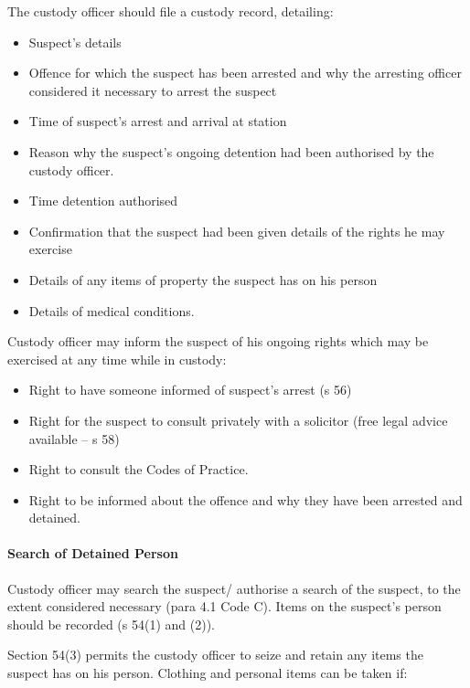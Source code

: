 \documentclass[
]{article}
\providecommand{\tightlist}{%
  \setlength{\itemsep}{0pt}\setlength{\parskip}{0pt}}
\begin{document}
The custody officer should file a custody record, detailing:

\begin{itemize}
\tightlist
\item
  Suspect's details
\item
  Offence for which the suspect has been arrested and why the arresting
  officer considered it necessary to arrest the suspect
\item
  Time of suspect's arrest and arrival at station
\item
  Reason why the suspect's ongoing detention had been authorised by the
  custody officer.
\item
  Time detention authorised
\item
  Confirmation that the suspect had been given details of the rights he
  may exercise
\item
  Details of any items of property the suspect has on his person
\item
  Details of medical conditions.
\end{itemize}

Custody officer may inform the suspect of his ongoing rights which may
be exercised at any time while in custody:

\begin{itemize}
\tightlist
\item
  Right to have someone informed of suspect's arrest (s 56)
\item
  Right for the suspect to consult privately with a solicitor (free
  legal advice available -- s 58)
\item
  Right to consult the Codes of Practice.
\item
  Right to be informed about the offence and why they have been arrested
  and detained.
\end{itemize}

\hypertarget{search-of-detained-person}{%
\paragraph{Search of Detained Person}\label{search-of-detained-person}}

Custody officer may search the suspect/ authorise a search of the
suspect, to the extent considered necessary (para 4.1 Code C). Items on
the suspect's person should be recorded (s 54(1) and (2)).

Section 54(3) permits the custody officer to seize and retain any items
the suspect has on his person. Clothing and personal items can be taken
if:
\end{document}

